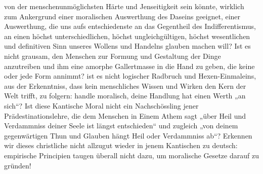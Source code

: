 von der menschenunmöglichsten Härte und Jenseitigkeit sein könnte, wirklich zum Ankergrund einer moralischen Auswerthung des Daseins geeignet, einer Auswerthung, die uns aufs entschiedenste an das Gegentheil des Indifferentismus, an einen höchst unterschiedlichen, höchst ungleichgültigen, höchst wesentlichen und definitiven Sinn unseres Wollens und Handelns glauben machen will? Ist es nicht grausam, den Menschen zur Formung und Gestaltung der Dinge anzutreiben und ihm eine amorphe Gallertmasse in die Hand zu geben, die keine oder jede Form annimmt? ist es nicht logischer Radbruch und Hexen-Einmaleins, aus der Erkenntniss, dass kein menschliches Wissen und Wirken den Kern der Welt trifft, zu folgern: handle moralisch,  deine Handlung hat einen Werth „an sich“? Ist diese Kantische Moral nicht ein Nachschössling jener Prädestinationslehre, die dem Menschen in Einem Athem sagt „über Heil und Verdammniss deiner Seele ist längst entschieden“ und zugleich „von deinem gegenwärtigen Thun und Glauben hängt Heil oder Verdammniss ab“? Erkennen wir dieses christliche  nicht allzugut wieder in jenem Kantischen  zu deutsch: empirische Principien taugen überall nicht dazu, um moralische Gesetze darauf zu gründen!
\par

